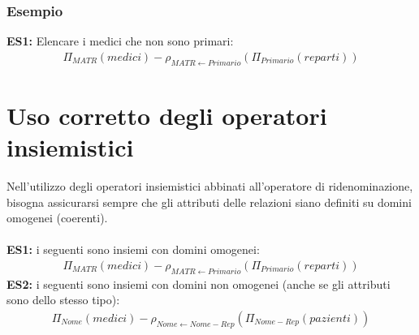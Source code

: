\subsubsection{Esempio}
\textbf{ES1:} Elencare i medici che non sono primari:
    \begin{equation}\begin{aligned}
        \Pi_{MATR} (medici) - 
        \rho_{MATR \leftarrow Primario}(\Pi_{Primario} (reparti))
    \end{aligned}\end{equation}
    
\section{Uso corretto degli operatori insiemistici}
Nell'utilizzo degli operatori insiemistici abbinati all'operatore di ridenominazione, bisogna assicurarsi sempre che gli attributi delle relazioni siano definiti su domini omogenei (coerenti).\\\\
\textbf{ES1:} i seguenti sono insiemi con domini omogenei:
    \begin{equation}\begin{aligned}
        \Pi_{MATR}(medici) - \rho_{MATR \leftarrow Primario}
        (\Pi_{Primario}(reparti))
    \end{aligned}\end{equation}
\textbf{ES2:} i seguenti sono insiemi con domini non omogenei (anche se gli attributi sono dello stesso tipo):
    \begin{equation}\begin{aligned}
        \Pi_{Nome}(medici) - \rho_{Nome \leftarrow Nome-Rep}
        (\Pi_{Nome-Rep}(pazienti))
    \end{aligned}\end{equation}

